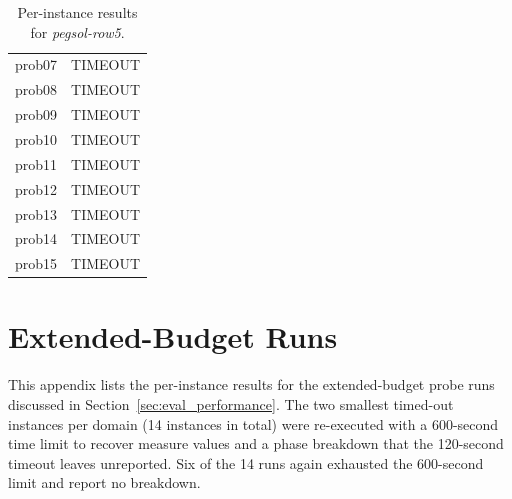 \begin{table}[H]
{\begin{tabular}{lrrr rr rr rr rrrrr}
            prob07           & \multicolumn{14}{c}{TIMEOUT}                                                                                                                               \\
            prob08           & \multicolumn{14}{c}{TIMEOUT}                                                                                                                               \\
            prob09           & \multicolumn{14}{c}{TIMEOUT}                                                                                                                               \\
            prob10           & \multicolumn{14}{c}{TIMEOUT}                                                                                                                               \\
            prob11           & \multicolumn{14}{c}{TIMEOUT}                                                                                                                               \\
            prob12           & \multicolumn{14}{c}{TIMEOUT}                                                                                                                               \\
            prob13           & \multicolumn{14}{c}{TIMEOUT}                                                                                                                               \\
            prob14           & \multicolumn{14}{c}{TIMEOUT}                                                                                                                               \\
            prob15           & \multicolumn{14}{c}{TIMEOUT}                                                                                                                               \\
            \bottomrule
        \end{tabular}%
    }
    \caption{Per-instance results for \textit{pegsol-row5}.}
    \label{tab:appendix_pegsolrow5}
\end{table}

\section{Extended-Budget Runs}
\label{app:extended}

This appendix lists the per-instance results for the extended-budget probe runs discussed in Section~\ref{sec:eval_performance}. The two smallest timed-out instances per domain (14 instances in total) were re-executed with a 600-second time limit to recover measure values and a phase breakdown that the 120-second timeout leaves unreported. Six of the 14 runs again exhausted the 600-second limit and report no breakdown.

